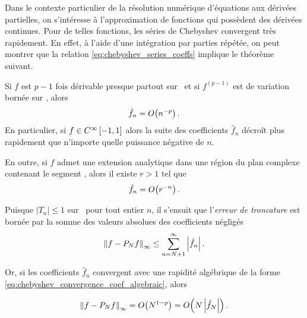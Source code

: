 Dans le contexte particulier de la résolution numérique d'équations aux dérivées partielles, %
on s'intéresse à l'approximation de fonctions qui possèdent des dérivées continues.
Pour de telles fonctions, les séries de Chebyshev convergent très rapidement. 
En effet, à l'aide d'une intégration par parties répétée, on peut montrer que la relation \eqref{eq:chebyshev_series_coeffs} implique le théorème suivant.
\begin{theoreme}
	Si $f$ est $p-1$ fois dérivable presque partout sur \chebopeninterval\ et si $f^{(p-1)}$ est de variation bornée sur \chebinterval, alors 
	\begin{equation}
		\hat{f}_n = \bigO{n^{-p}}.
		\label{eq:chebyshev_convergence_coef_algebraic}
	\end{equation}
	En particulier, si $f \in C^{\infty}\left[ -1, 1 \right]$ alors la suite des coefficients $\hat{f}_n$ décroît plus rapidement que n'importe quelle puissance négative de $n$.\par
	En outre, si $f$ admet une extension analytique dans une région %
	du plan complexe contenant le segment \chebinterval , alors il existe $r > 1$ tel que
	\begin{equation}
		\hat{f}_n = \bigO{r^{-n}}.
		\label{eq:chebyshev_convergence_coef_geometric}
	\end{equation}
\end{theoreme}
\par

Puisque $\left|T_n \right| \leq 1$ sur \chebinterval\ pour tout entier $n$, il s'ensuit que l'\textit{erreur de troncature} est bornée par la somme des valeurs absolues des coefficients négligés
\begin{equation}
	\norminf{f - \truncseries{f}{N}} \leq \sum_{n=N+1}^{\infty} 
	\left| \hat{f}_n \right|.
	\label{eq:chebyshev_truncation_error_bound}
\end{equation}

Or, si les coefficients $\hat{f}_n$ convergent avec une rapidité algébrique de la forme \eqref{eq:chebyshev_convergence_coef_algebraic}, alors\par
\begin{equation}
	\norminf{f - \truncseries{f}{N}} 
	= \bigO{N^{1-p}} 
	= \bigO{N \left| \hat{f}_N \right|}.
	\label{eq:chebyshev_truncation_error_estimator_algebraic}
\end{equation}

